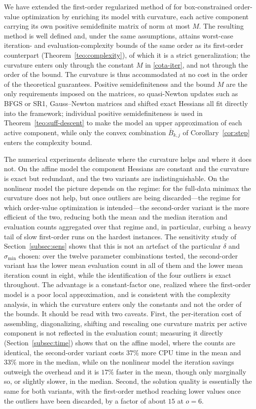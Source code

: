 \documentclass[11pt]{article}
\begin{document}
We have extended the first-order regularized method of \cite{alvarezovo} for
box-constrained order-value optimization by enriching its model with curvature,
each active component carrying its own positive semidefinite matrix of norm at
most $M$. The resulting method is well defined and, under the same
assumptions, attains worst-case iteration- and evaluation-complexity bounds of
the same order as its first-order counterpart (Theorem~\ref{teo:complexity}), of
which it is a strict generalization; the curvature enters only through the
constant $M$ in \eqref{cota-iter}, and not through the order of the bound. The
curvature is thus accommodated at no cost in the order of the theoretical
guarantees. Positive semidefiniteness and the bound $M$ are the only
requirements imposed on the matrices, so quasi-Newton updates such as BFGS or
SR1, Gauss--Newton matrices and shifted exact Hessians all fit directly into the
framework; individual positive semidefiniteness is used in
Theorem~\ref{teo:suff-descent} to make the model an upper approximation of each
active component, while only the convex combination $\bar{B}_{k,j}$ of
Corollary~\ref{cor:step} enters the complexity bound.

The numerical experiments delineate where the curvature helps and where it does
not. On the affine model the component Hessians are constant and the curvature
is exact but redundant, and the two variants are indistinguishable. On the
nonlinear model the picture depends on the regime: for the full-data minimax the
curvature does not help, but once outliers are being discarded---the regime for
which order-value optimization is intended---the second-order variant is the
more efficient of the two, reducing both the mean and the median iteration and
evaluation counts aggregated over that regime and, in particular, curbing a
heavy tail of slow first-order runs on the hardest instances. The sensitivity
study of Section~\ref{subsec:sens} shows that this is not an artefact of the
particular $\delta$ and $\sigma_{\min}$ chosen: over the twelve parameter
combinations tested, the second-order variant has the lower mean evaluation
count in all of them and the lower mean iteration count in eight, while the
identification of the four outliers is exact throughout. The advantage is a
constant-factor one, realized where the first-order model is a poor local
approximation, and is consistent with the complexity analysis, in which the
curvature enters only the constants and not the order of the bounds. It should
be read with two caveats. First, the per-iteration cost of assembling,
diagonalizing, shifting and rescaling one curvature matrix per active component
is not reflected in the evaluation count; measuring it directly
(Section~\ref{subsec:time}) shows that on the affine model, where the counts are
identical, the second-order variant costs $37\%$ more CPU time in the mean and
$33\%$ more in the median, while on the nonlinear model the iteration savings
outweigh the overhead and it is $17\%$ faster in the mean, though only
marginally so, or slightly slower, in the median. Second, the solution quality
is essentially the same for both variants, with the first-order method reaching
lower values once the outliers have been discarded, by a factor of about $15$ at
$o = 6$.
\end{document}
